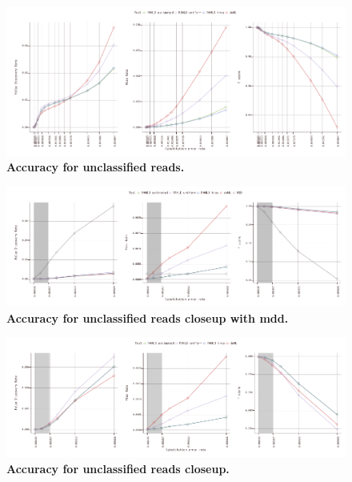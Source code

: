 \documentclass[10pt,twocolumn]{article}
\begin{document}
\begin{figure}[htbp]
\centering
\includegraphics[keepaspectratio,scale=1]{../plot/9_unclassified_accuracy_0550}
\caption{\footnotesize{\textbf{Accuracy for unclassified reads.} } }
\label{fig:09}
\end{figure}

\begin{figure}[htbp]
\centering
\includegraphics[keepaspectratio,scale=1]{../plot/10_unclassified_accuracy_0060_mdd}
\caption{\footnotesize{\textbf{Accuracy for unclassified reads closeup with mdd.} } }
\label{fig:10}
\end{figure}

\begin{figure}[htbp]
\centering
\includegraphics[keepaspectratio,scale=1]{../plot/11_unclassified_accuracy_0060}
\caption{\footnotesize{\textbf{Accuracy for unclassified reads closeup.} } }
\label{fig:11}
\end{figure}
\end{document}
